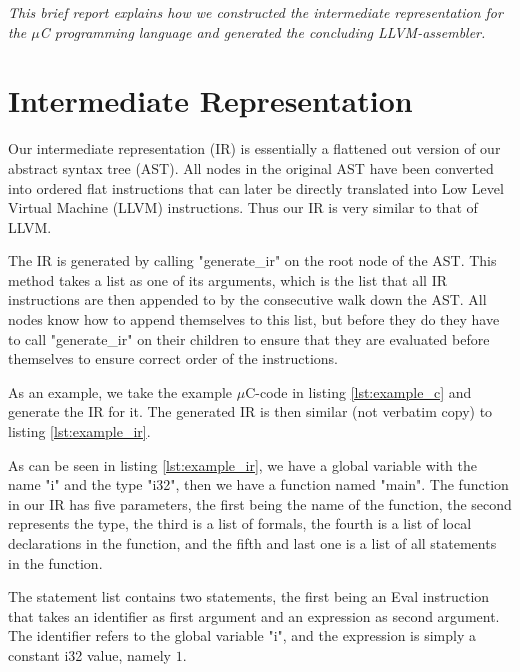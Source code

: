 \textit{This brief report explains how we constructed the intermediate representation for the $\mu$C programming language and generated the concluding LLVM-assembler.}

\section{Intermediate Representation}

Our intermediate representation (IR) is essentially a flattened out version of our abstract syntax tree (AST).
All nodes in the original AST have been converted into ordered flat instructions that can later be directly translated into Low Level Virtual Machine (LLVM) instructions. Thus our IR is very similar to that of LLVM.

The IR is generated by calling "generate\_ir" on the root node of the AST. This method takes a list as one of its arguments, which is the list that all IR instructions are then appended to by the consecutive walk down the AST. All nodes know how to append themselves to this list, but before they do they have to call "generate\_ir" on their children to ensure that they are evaluated before themselves to ensure correct order of the instructions.

As an example, we take the example $\mu$C-code in listing \ref{lst:example_c} and generate the IR for it. The generated IR is then similar (not verbatim copy) to listing \ref{lst:example_ir}.





As can be seen in listing \ref{lst:example_ir}, we have a global variable with the name "i" and the type "i32", then we have a function named "main". The function in our IR has five parameters, the first being the name of the function, the second represents the type, the third is a list of formals, the fourth is a list of local declarations in the function, and the fifth and last one is a list of all statements in the function.

The statement list contains two statements, the first being an Eval instruction that takes an identifier as first argument and an expression as second argument. The identifier refers to the global variable "i", and the expression is simply a constant i32 value, namely $1$.


